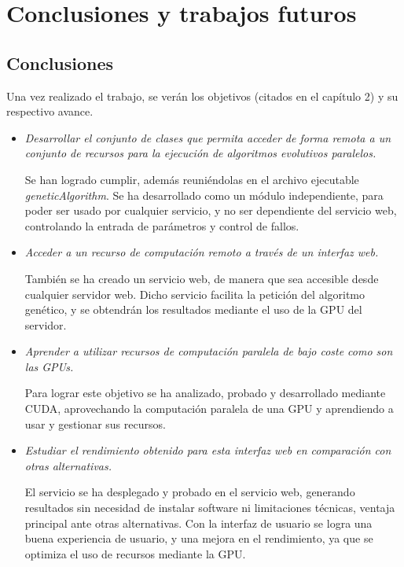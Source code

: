 \chapter{Conclusiones y trabajos futuros}


\bigskip
\section{Conclusiones}
\bigskip

Una vez realizado el trabajo, se verán los objetivos (citados en el capítulo 2) y su respectivo avance.


\begin{itemize}
	
	\item  \textit{Desarrollar el conjunto de clases que permita acceder de forma remota a un conjunto de recursos para la ejecución de algoritmos evolutivos paralelos.}
	
	Se han logrado cumplir, además reuniéndolas en el archivo ejecutable \textit{geneticAlgorithm}. Se ha desarrollado como un módulo independiente, para poder ser usado por cualquier servicio, y no ser dependiente del servicio web, controlando la entrada de parámetros y control de fallos.
	
	\item  \textit{Acceder a un recurso de computación remoto a través de un interfaz web.}
	
	También se ha creado un servicio web, de manera que sea accesible desde cualquier servidor web. Dicho servicio facilita la petición del algoritmo genético, y se obtendrán los resultados mediante el uso de la GPU del servidor.
	
	\item  \textit{Aprender a utilizar recursos de computación paralela de bajo coste como son las GPUs.}
	
	Para lograr este objetivo se ha analizado, probado y desarrollado mediante CUDA, aprovechando la computación paralela de una GPU y aprendiendo a usar y gestionar sus recursos.
	
	\item  \textit{Estudiar el rendimiento obtenido para esta interfaz web en comparación con otras alternativas.}
	
	El servicio se ha desplegado y probado en el servicio web, generando resultados sin necesidad de instalar software ni limitaciones técnicas, ventaja principal ante otras alternativas. Con la interfaz de usuario se logra una buena experiencia de usuario, y una mejora en el rendimiento, ya que se optimiza el uso de recursos mediante la GPU.

	
\end{itemize}	


